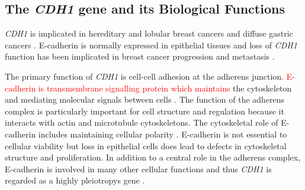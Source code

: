 \subsection{The \textit{CDH1} gene and its Biological Functions}
\textit{CDH1} is implicated in \gls{hereditary} and  lobular breast cancers and diffuse gastric cancers \citep{Berx1996,DeLeeuw1997,Berx2009,Vos1997,Semb1998,Masciari2007,Guilford1998}. %
\gls{E-cadherin} is normally expressed in epithelial tissues %
and loss of \textit{CDH1} function has been implicated in breast cancer progression and metastasis \citep{Berx1995,Becker1994,Christofori1999}.

The primary function of \textit{CDH1} is cell-cell adhesion at the adherens junction\textcolor{red}{. \gls{E-cadherin} is transmembrane signalling protein which maintains} the cytoskeleton and mediating molecular signals between cells  \citep{Chen2014, Tunggal2005}. The function of the adherens complex is particularly important for cell structure and regulation because it interacts with actin and microtubule cytoskeletons. The cytoskeletal role of \gls{E-cadherin} %
includes maintaining cellular polarity \citep{Jeanes2008}. \gls{E-cadherin} is not \gls{essential} to cellular viability but loss in epithelial cells does lead to defects in cytoskeletal structure and proliferation. In addition to a central role in the adherens complex, \gls{E-cadherin} is involved in many other cellular functions and thus \textit{CDH1} is regarded as a highly \glspl{pleiotropy} gene \citep{Kroepil2012}.


